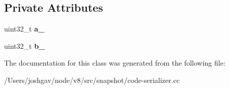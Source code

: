 \subsection*{Private Attributes}
\begin{DoxyCompactItemize}
\item 
uint32\+\_\+t {\bfseries a\+\_\+}\hypertarget{classv8_1_1internal_1_1_checksum_af00af84d377921e32ca0bb3c59efa160}{}\label{classv8_1_1internal_1_1_checksum_af00af84d377921e32ca0bb3c59efa160}

\item 
uint32\+\_\+t {\bfseries b\+\_\+}\hypertarget{classv8_1_1internal_1_1_checksum_a4c3a98dc2d129521efdd1110cd77db46}{}\label{classv8_1_1internal_1_1_checksum_a4c3a98dc2d129521efdd1110cd77db46}

\end{DoxyCompactItemize}


The documentation for this class was generated from the following file\+:\begin{DoxyCompactItemize}
\item 
/\+Users/joshgav/node/v8/src/snapshot/code-\/serializer.\+cc\end{DoxyCompactItemize}
